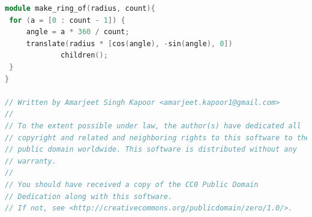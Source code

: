 \begin{lstlisting}[language=c++]
module make_ring_of(radius, count){
 for (a = [0 : count - 1]) {
     angle = a * 360 / count;
     translate(radius * [cos(angle), -sin(angle), 0])
             children();
 }
}

// Written by Amarjeet Singh Kapoor <amarjeet.kapoor1@gmail.com>
//
// To the extent possible under law, the author(s) have dedicated all
// copyright and related and neighboring rights to this software to the
// public domain worldwide. This software is distributed without any
// warranty.
//
// You should have received a copy of the CC0 Public Domain
// Dedication along with this software.
// If not, see <http://creativecommons.org/publicdomain/zero/1.0/>.
\end{lstlisting}

